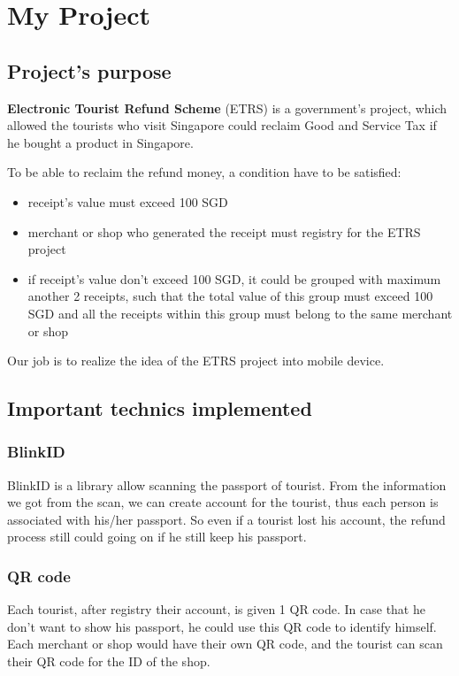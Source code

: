 \chapter{My Project}

\section{Project's purpose}\label{condition}

\textbf{Electronic Tourist Refund Scheme} (ETRS) is a government's project, which allowed the tourists who visit Singapore could reclaim Good and Service Tax if he bought a product in Singapore.

To be able to reclaim the refund money, a condition have to be satisfied: 
\begin{itemize}
	\item receipt's value must exceed 100 SGD
	\item merchant or shop who generated the receipt must registry for the ETRS project
	\item if receipt's value don't exceed 100 SGD, it could be grouped with maximum another 2 receipts, such that the total value of this group must exceed 100 SGD and all the receipts within this group must belong to the same merchant or shop
\end{itemize}



Our job is to realize the idea of the ETRS project into mobile device. 

\section{Important technics implemented}

\subsection{BlinkID}
BlinkID is a library allow scanning the passport of tourist. From the information we got from the scan, we can create account for the tourist, thus each person is associated with his/her passport. So even if a tourist lost his account, the refund process still could going on if he still keep his passport.

\subsection{QR code}
Each tourist, after registry their account, is given 1 QR code. In case that he don't want to show his passport, he could use this QR code to identify himself. Each merchant or shop would have their own QR code, and the tourist can scan their QR code for the ID of the shop.

